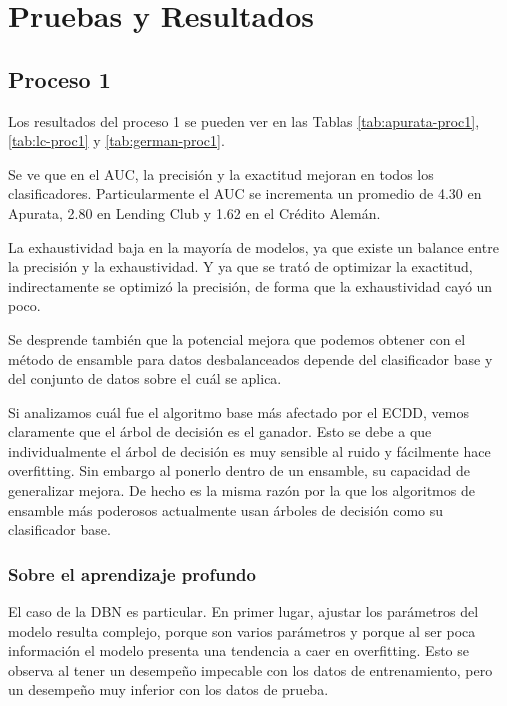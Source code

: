 \chapter{Pruebas y Resultados}

\section{Proceso 1} %

Los resultados del proceso 1 se pueden ver en las Tablas \ref{tab:apurata-proc1}, \ref{tab:lc-proc1} y \ref{tab:german-proc1}.

Se ve que en el \ac{AUC}, la precisión y la exactitud mejoran en todos los clasificadores. Particularmente el AUC se incrementa un promedio de 4.30 en Apurata, 2.80 en Lending Club y 1.62 en el Crédito Alemán.

La exhaustividad baja en la mayoría de modelos, ya que existe un balance entre la precisión y la exhaustividad. Y ya que se trató de optimizar la exactitud, indirectamente se optimizó la precisión, de forma que la exhaustividad cayó un poco.

Se desprende también que la potencial mejora que podemos obtener con el método de ensamble para datos desbalanceados depende del clasificador base y del conjunto de datos sobre el cuál se aplica.

Si analizamos cuál fue el algoritmo base más afectado por el \ac{ECDD}, vemos claramente que el árbol de decisión es el ganador. Esto se debe a que individualmente el árbol de decisión es muy sensible al ruido y fácilmente hace overfitting. Sin embargo al ponerlo dentro de un ensamble, su capacidad de generalizar mejora. De hecho es la misma razón por la que los algoritmos de ensamble más poderosos actualmente usan árboles de decisión como su clasificador base.

\subsection{Sobre el aprendizaje profundo}

El caso de la \ac{DBN} es particular. En primer lugar, ajustar los parámetros del modelo resulta complejo, porque son varios parámetros y porque al ser poca información el modelo presenta una tendencia a caer en overfitting. Esto se observa al tener un desempeño impecable con los datos de entrenamiento, pero un desempeño muy inferior con los datos de prueba.

